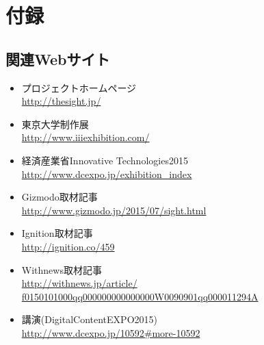\section{付録}	

\subsection{関連Webサイト}
\begin{itemize}
\item プロジェクトホームページ\\\url{http://thesight.jp/}
\item 東京大学制作展\\\url{http://www.iiiexhibition.com/}
\item 経済産業省Innovative Technologies2015\\\url{http://www.dcexpo.jp/exhibition_index}
\item Gizmodo取材記事\\\url{http://www.gizmodo.jp/2015/07/sight.html}
\item Ignition取材記事\\\url{http://ignition.co/459}
\item Withnews取材記事\\\url{http://withnews.jp/article/}
  \\\url{f0150101000qq000000000000000W0090901qq000011294A}
\item 講演(DigitalContentEXPO2015)\\\url{http://www.dcexpo.jp/10592#more-10592}
\end{itemize}
